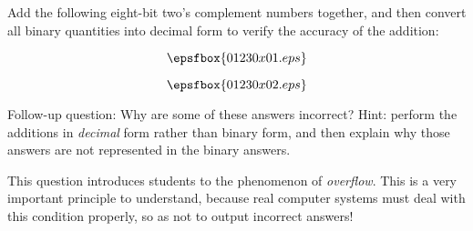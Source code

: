 

Add the following eight-bit two's complement numbers together, and then convert all binary quantities into decimal form to verify the accuracy of the addition:

\vskip 10pt

$$\epsfbox{01230x01.eps}$$

\vskip 10pt







$$\epsfbox{01230x02.eps}$$

Follow-up question: Why are some of these answers incorrect?  Hint: perform the additions in {\it decimal} form rather than binary form, and then explain why those answers are not represented in the binary answers.







This question introduces students to the phenomenon of {\it overflow}.  This is a very important principle to understand, because real computer systems must deal with this condition properly, so as not to output incorrect answers!




